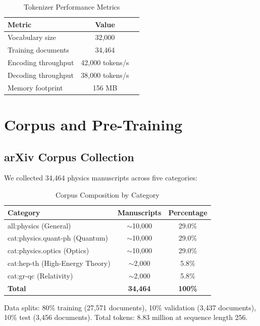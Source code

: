 \documentclass[11pt,a4paper,twocolumn]{article}
\theoremstyle{plain}
\theoremstyle{definition}
\begin{document}
\begin{table}[H]
\centering
\caption{Tokenizer Performance Metrics}
\begin{tabular}{lcc}
\toprule
\textbf{Metric} & \textbf{Value} \\
\midrule
Vocabulary size & 32,000 \\
Training documents & 34,464 \\
Encoding throughput & 42,000 tokens/s \\
Decoding throughput & 38,000 tokens/s \\
Memory footprint & 156 MB \\
\bottomrule
\end{tabular}
\end{table}

\section{Corpus and Pre-Training}

\subsection{arXiv Corpus Collection}

We collected 34,464 physics manuscripts across five categories:

\begin{table}[H]
\centering
\caption{Corpus Composition by Category}
\begin{tabular}{lcc}
\toprule
\textbf{Category} & \textbf{Manuscripts} & \textbf{Percentage} \\
\midrule
all:physics (General) & $\sim$10,000 & 29.0\% \\
cat:physics.quant-ph (Quantum) & $\sim$10,000 & 29.0\% \\
cat:physics.optics (Optics) & $\sim$10,000 & 29.0\% \\
cat:hep-th (High-Energy Theory) & $\sim$2,000 & 5.8\% \\
cat:gr-qc (Relativity) & $\sim$2,000 & 5.8\% \\
\midrule
\textbf{Total} & \textbf{34,464} & \textbf{100\%} \\
\bottomrule
\end{tabular}
\end{table}

Data splits: 80\% training (27,571 documents), 10\% validation 
(3,437 documents), 10\% test (3,456 documents). Total tokens: 
8.83 million at sequence length 256.
\end{document}
